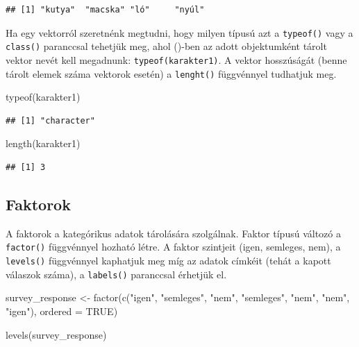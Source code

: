 \documentclass[
]{book}
\newenvironment{Shaded}{\begin{snugshade}}{\end{snugshade}}
\newcommand{\AttributeTok}[1]{\textcolor[rgb]{0.77,0.63,0.00}{#1}}
\newcommand{\ConstantTok}[1]{\textcolor[rgb]{0.00,0.00,0.00}{#1}}
\newcommand{\FunctionTok}[1]{\textcolor[rgb]{0.00,0.00,0.00}{#1}}
\newcommand{\NormalTok}[1]{#1}
\newcommand{\OtherTok}[1]{\textcolor[rgb]{0.56,0.35,0.01}{#1}}
\newcommand{\StringTok}[1]{\textcolor[rgb]{0.31,0.60,0.02}{#1}}
\begin{document}
\begin{verbatim}
## [1] "kutya"  "macska" "ló"     "nyúl"
\end{verbatim}

Ha egy vektorról szeretnénk megtudni, hogy milyen típusú azt a
\texttt{typeof()} vagy a \texttt{class()} paranccsal tehetjük meg, ahol
()-ben az adott objektumként tárolt vektor nevét kell megadnunk:
\texttt{typeof(karakter1)}. A vektor hosszúságát (benne tárolt elemek
száma vektorok esetén) a \texttt{lenght()} függvénnyel tudhatjuk meg.

\begin{Shaded}
\begin{Highlighting}[]
\FunctionTok{typeof}\NormalTok{(karakter1)}
\end{Highlighting}
\end{Shaded}

\begin{verbatim}
## [1] "character"
\end{verbatim}

\begin{Shaded}
\begin{Highlighting}[]
\FunctionTok{length}\NormalTok{(karakter1)}
\end{Highlighting}
\end{Shaded}

\begin{verbatim}
## [1] 3
\end{verbatim}

\hypertarget{faktorok}{%
\subsection{Faktorok}\label{faktorok}}

A faktorok a kategórikus adatok tárolására szolgálnak. Faktor típusú
változó a \texttt{factor()} függvénnyel hozható létre. A faktor
szintjeit (igen, semleges, nem), a \texttt{levels()} függvénnyel
kaphatjuk meg míg az adatok címkéit (tehát a kapott válaszok száma), a
\texttt{labels()} paranccsal érhetjük el.

\begin{Shaded}
\begin{Highlighting}[]
\NormalTok{survey\_response }\OtherTok{\textless{}{-}} \FunctionTok{factor}\NormalTok{(}\FunctionTok{c}\NormalTok{(}\StringTok{"igen"}\NormalTok{, }\StringTok{"semleges"}\NormalTok{, }\StringTok{"nem"}\NormalTok{, }\StringTok{"semleges"}\NormalTok{, }\StringTok{"nem"}\NormalTok{, }\StringTok{"nem"}\NormalTok{, }\StringTok{"igen"}\NormalTok{), }\AttributeTok{ordered =} \ConstantTok{TRUE}\NormalTok{)}


\FunctionTok{levels}\NormalTok{(survey\_response)}
\end{Highlighting}
\end{Shaded}
\end{document}
